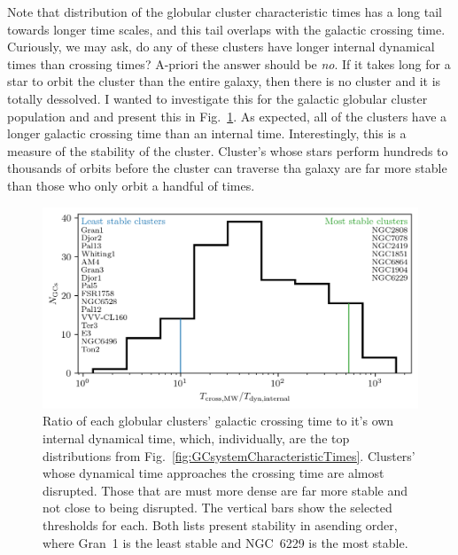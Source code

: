         Note that distribution of the globular cluster characteristic times has a long tail towards longer time scales, and this tail overlaps with the galactic crossing time. Curiously, we may ask, do any of these clusters have longer internal dynamical times than crossing times? A-priori the answer should be \textit{no}. If it takes long for a star to orbit the cluster than the entire galaxy, then there is no cluster and it is totally dessolved. I wanted to investigate this for the galactic globular cluster population and and present this in Fig.~\ref{fig:GCsystemStabilityDynamicalTimeRatios}. As expected, all of the clusters have a longer galactic crossing time than an internal time. Interestingly, this is a measure of the stability of the cluster. Cluster's whose stars perform hundreds to thousands of orbits before the cluster can traverse tha galaxy are far more stable than those who only orbit a handful of times. 
        \begin{figure}
            \centering
            \includegraphics[width=\linewidth]{images/GCsystemStabilityDynamicalTimeRatios.png}
            \caption{Ratio of each globular clusters' galactic crossing time to it's own internal dynamical time, which, individually, are the top distributions from Fig.~\ref{fig:GCsystemCharacteristicTimes}. Clusters' whose dynamical time approaches the crossing time are almost disrupted. Those that are must more dense are far more stable and not close to being disrupted. The vertical bars show the selected thresholds for each. Both lists present stability in asending order, where Gran~1 is the least stable and NGC~6229 is the most stable. }
            \label{fig:GCsystemStabilityDynamicalTimeRatios}
        \end{figure}
        
